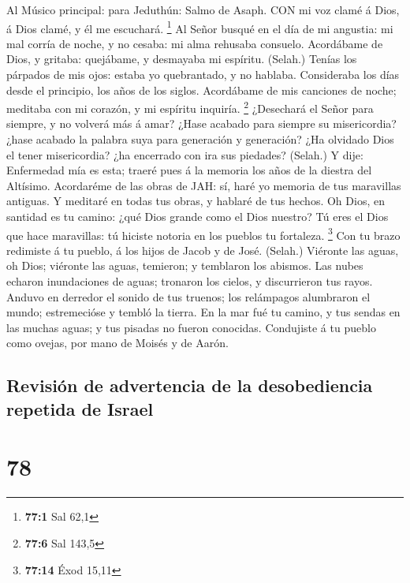  Al Músico principal: para Jeduthún: Salmo de Asaph. CON mi
voz clamé á Dios, á Dios clamé, y él me escuchará. \footnote{\textbf{77:1}
  Sal 62,1}  Al Señor busqué en el día de mi angustia: mi
mal corría de noche, y no cesaba: mi alma rehusaba consuelo.
 Acordábame de Dios, y gritaba: quejábame, y desmayaba mi
espíritu. (Selah.)  Tenías los párpados de mis ojos: estaba
yo quebrantado, y no hablaba.  Consideraba los días desde el
principio, los años de los siglos.  Acordábame de mis
canciones de noche; meditaba con mi corazón, y mi espíritu inquiría.
\footnote{\textbf{77:6} Sal 143,5}  ¿Desechará el Señor para
siempre, y no volverá más á amar?  ¿Hase acabado para
siempre su misericordia? ¿hase acabado la palabra suya para generación y
generación?  ¿Ha olvidado Dios el tener misericordia? ¿ha
encerrado con ira sus piedades? (Selah.)  Y dije:
Enfermedad mía es esta; traeré pues á la memoria los años de la diestra
del Altísimo.  Acordaréme de las obras de JAH: sí, haré yo
memoria de tus maravillas antiguas.  Y meditaré en todas
tus obras, y hablaré de tus hechos.  Oh Dios, en santidad
es tu camino: ¿qué Dios grande como el Dios nuestro?  Tú
eres el Dios que hace maravillas: tú hiciste notoria en los pueblos tu
fortaleza. \footnote{\textbf{77:14} Éxod 15,11}  Con tu
brazo redimiste á tu pueblo, á los hijos de Jacob y de José. (Selah.)
 Viéronte las aguas, oh Dios; viéronte las aguas, temieron;
y temblaron los abismos.  Las nubes echaron inundaciones de
aguas; tronaron los cielos, y discurrieron tus rayos. 
Anduvo en derredor el sonido de tus truenos; los relámpagos alumbraron
el mundo; estremecióse y tembló la tierra.  En la mar fué
tu camino, y tus sendas en las muchas aguas; y tus pisadas no fueron
conocidas.  Condujiste á tu pueblo como ovejas, por mano de
Moisés y de Aarón.

\hypertarget{revisiuxf3n-de-advertencia-de-la-desobediencia-repetida-de-israel}{%
\subsection{Revisión de advertencia de la desobediencia repetida de
Israel}\label{revisiuxf3n-de-advertencia-de-la-desobediencia-repetida-de-israel}}

\hypertarget{section-77}{%
\section{78}\label{section-77}}

